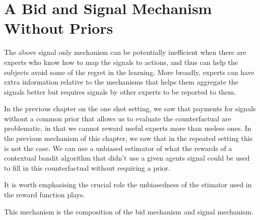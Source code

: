 	




\section{A Bid and Signal Mechanism Without Priors}



The above signal only mechanism can be potentially inefficient when there are experts who know how to map the signals to actions, and thus can help the subjects avoid some of the regret in the learning.
More broadly, experts can have extra information relative to the mechanisms that helps them aggregate the signals better but requires signals by other experts to be reported to them. 

In the previous chapter on the one shot setting, we saw that payments for  signals without a common prior that allows us to evaluate the counterfactual are problematic, in that we cannot reward useful experts more than useless ones. In the previous mechanism of this chapter, we saw that in the repeated setting this is not the case. We can use a unbiased estimator of what the rewards of a contextual bandit algorithm that didn't use a given agents signal could be used to fill in this counterfactual without requiring a prior.

It is worth emphasising the crucial role the unbiasedness of the stimator used in the reward function plays.

This mechanism is the composition of the bid mechanism and signal mechanism.


